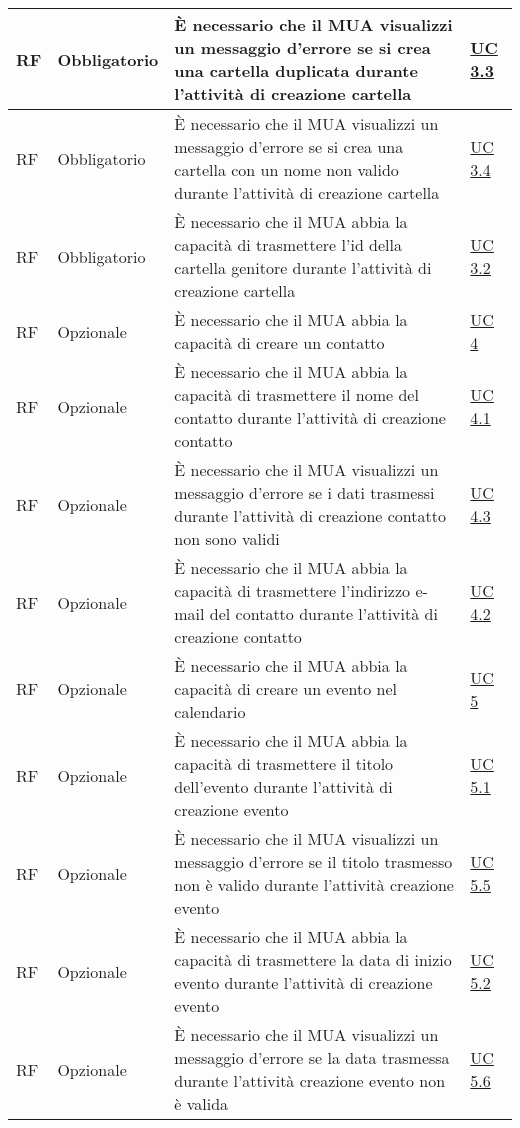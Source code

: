 \begin{longtable}{*{1}{>{\centering\arraybackslash}p{1.5cm}}*{1}{>{\centering\arraybackslash}p{2.5cm}}p{6cm}*{1}{>{\centering\arraybackslash}p{3cm}}}
    \\\hline
    RF & Obbligatorio & È necessario che il MUA visualizzi un messaggio d'errore se si crea una cartella duplicata durante l'attività di creazione cartella& \hyperref[sec:UC3.3]{UC 3.3}
    \\\hline
    RF & Obbligatorio & È necessario che il MUA visualizzi un messaggio d'errore se si crea una cartella con un nome non valido durante l'attività di creazione cartella & \hyperref[sec:UC3.4]{UC 3.4}
    \\\hline
    RF & Obbligatorio & È necessario che il MUA abbia la capacità di trasmettere l'id della cartella genitore durante l'attività di creazione cartella & \hyperref[sec:UC3.2]{UC 3.2}
    \\\hline
    RF & Opzionale & È necessario che il MUA abbia la capacità di creare un contatto & \hyperref[sec:UC4]{UC 4}
    \\\hline
    RF & Opzionale & È necessario che il MUA abbia la capacità di trasmettere il nome del contatto durante l'attività di creazione contatto & \hyperref[sec:UC4.1]{UC 4.1}
    \\\hline
    RF & Opzionale & È necessario che il MUA visualizzi un messaggio d'errore se i dati trasmessi durante l'attività di creazione contatto non sono validi & \hyperref[sec:UC4.3]{UC 4.3}
    \\\hline
    RF & Opzionale & È necessario che il MUA abbia la capacità di trasmettere l'indirizzo e-mail del contatto durante l'attività di creazione contatto & \hyperref[sec:UC4.2]{UC 4.2}
    \\\hline
    RF & Opzionale & È necessario che il MUA abbia la capacità di creare un evento nel calendario & \hyperref[sec:UC5]{UC 5}
    \\\hline
    RF & Opzionale & È necessario che il MUA abbia la capacità di trasmettere il titolo dell'evento durante l'attività di creazione evento & \hyperref[sec:UC5.1]{UC 5.1}
    \\\hline
    RF & Opzionale & È necessario che il MUA visualizzi un messaggio d'errore se il titolo trasmesso non è valido durante l'attività creazione evento & \hyperref[sec:UC5.5]{UC 5.5}
    \\\hline
    RF & Opzionale & È necessario che il MUA abbia la capacità di trasmettere la data di inizio evento durante l'attività di creazione evento & \hyperref[sec:UC5.2]{UC 5.2}
    \\\hline
    RF & Opzionale & È necessario che il MUA visualizzi un messaggio d'errore se la data trasmessa durante l'attività creazione evento non è valida & \hyperref[sec:UC5.6]{UC 5.6}

\end{longtable}

